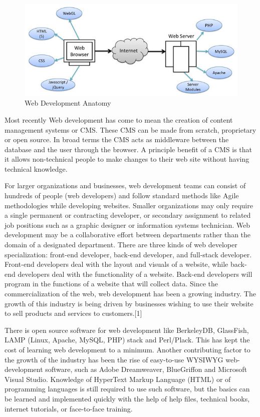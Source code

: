 \begin{figure}[ht]
\centering
\includegraphics[scale=0.48]{images/WebTechnology.jpg}
\caption{Web Development Anatomy}
\label{fig:Anatomy}
\end{figure}

Most recently Web development has come to mean the creation of content management systems or CMS. These CMS can be made from scratch, proprietary or open source. In broad terms the CMS acts as middleware between the database and the user through the browser. A principle benefit of a CMS is that it allows non-technical people to make changes to their web site without having technical knowledge.

For larger organizations and businesses, web development teams can consist of hundreds of people (web developers) and follow standard methods like Agile methodologies while developing websites. Smaller organizations may only require a single permanent or contracting developer, or secondary assignment to related job positions such as a graphic designer or information systems technician. Web development may be a collaborative effort between departments rather than the domain of a designated department. There are three kinds of web developer specialization: front-end developer, back-end developer, and full-stack developer. Front-end developers deal with the layout and visuals of a website, while back-end developers deal with the functionality of a website. Back-end developers will program in the functions of a website that will collect data.
Since the commercialization of the web, web development has been a growing industry. The growth of this industry is being driven by businesses wishing to use their website to sell products and services to customers.[1]

There is open source software for web development like BerkeleyDB, GlassFish, LAMP (Linux, Apache, MySQL, PHP) stack and Perl/Plack. This has kept the cost of learning web development to a minimum. Another contributing factor to the growth of the industry has been the rise of easy-to-use WYSIWYG web-development software, such as Adobe Dreamweaver, BlueGriffon and Microsoft Visual Studio. Knowledge of HyperText Markup Language (HTML) or of programming languages is still required to use such software, but the basics can be learned and implemented quickly with the help of help files, technical books, internet tutorials, or face-to-face training.



